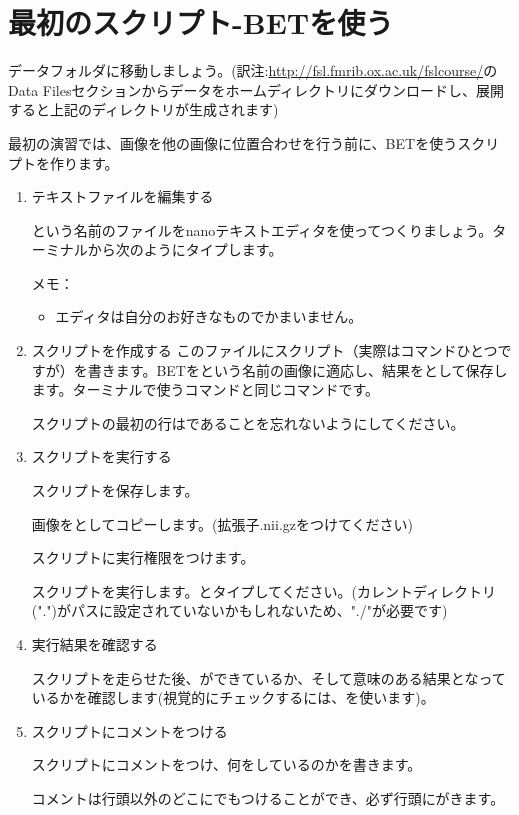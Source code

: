 \documentclass{jsarticle}
\begin{document}
\section{最初のスクリプト-BETを使う}
データフォルダに移動しましょう。(訳注:\url{http://fsl.fmrib.ox.ac.uk/fslcourse/}のData Filesセクションからデータをホームディレクトリにダウンロードし、展開すると上記のディレクトリが生成されます)

\bigskip

{\color{red}}

\bigskip

最初の演習では、画像を他の画像に位置合わせを行う前に、BETを使うスクリプトを作ります。

\begin{enumerate}
\item テキストファイルを編集する

{\color{red}}という名前のファイルをnanoテキストエディタを使ってつくりましょう。ターミナルから次のようにタイプします。

{\color{red}}

メモ：
	\begin{itemize}
	\item エディタは自分のお好きなものでかまいません。
	\end{itemize}

\item スクリプトを作成する
このファイルにスクリプト（実際はコマンドひとつですが）を書きます。BETを{\color{red}}という名前の画像に適応し、結果を{\color{red}}として保存します。ターミナルで使うコマンドと同じコマンドです。

{\color{red}}

スクリプトの最初の行は{\color{red}{\tt \#!/bin/sh}}であることを忘れないようにしてください。

\item スクリプトを実行する

スクリプトを保存します。

画像{\color{red}}を{\color{red}}としてコピーします。(拡張子.nii.gzをつけてください)

スクリプトに実行権限をつけます。

{\color{red}}

スクリプトを実行します。{\color{red}}とタイプしてください。(カレントディレクトリ(".")がパスに設定されていないかもしれないため、"./"が必要です)

\item 実行結果を確認する

スクリプトを走らせた後、{\color{red}}ができているか、そして意味のある結果となっているかを確認します(視覚的にチェックするには、{\color{red}}を使います)。

\item スクリプトにコメントをつける

スクリプトにコメントをつけ、何をしているのかを書きます。

コメントは行頭以外のどこにでもつけることができ、必ず行頭に{\color{red}{\tt \#}}がきます。

\end{enumerate}
\end{document}
